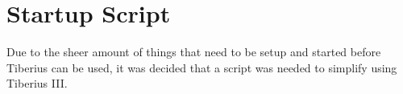 \section{Startup Script}
Due to the sheer amount of things that need to be setup and started before Tiberius can be used, it was decided that a script was needed to simplify using Tiberius III. 

